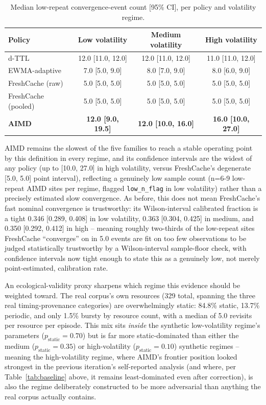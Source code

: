 \documentclass[11pt,letterpaper]{article}
\begin{document}
\begin{table}[!htbp]
\centering
\caption{Median low-repeat convergence-event count [95\% CI], per policy and volatility regime.}
\label{tab:convergence}
\begin{tabular}{lccc}
\toprule
Policy & Low volatility & Medium volatility & High volatility \\
\midrule
d-TTL & 12.0 [11.0, 12.0] & 12.0 [11.0, 12.0] & 11.0 [11.0, 12.0] \\
EWMA-adaptive & 7.0 [5.0, 9.0] & 8.0 [7.0, 9.0] & 8.0 [6.0, 9.0] \\
FreshCache (raw) & 5.0 [5.0, 5.0] & 5.0 [5.0, 5.0] & 5.0 [5.0, 5.0] \\
FreshCache (pooled) & 5.0 [5.0, 5.0] & 5.0 [5.0, 5.0] & 5.0 [5.0, 5.0] \\
\textbf{AIMD} & \textbf{12.0 [9.0, 19.5]} & \textbf{12.0 [10.0, 16.0]} & \textbf{16.0 [10.0, 27.0]} \\
\bottomrule
\end{tabular}
\end{table}

AIMD remains the slowest of the five families to reach a stable operating point by this definition in
every regime, and its confidence intervals are the widest of any policy (up to [10.0, 27.0] in high
volatility, versus FreshCache's degenerate [5.0, 5.0] point interval), reflecting a genuinely low sample
count (n=6-9 low-repeat AIMD sites per regime, flagged \texttt{low\_n\_flag} in low volatility) rather than a
precisely estimated slow convergence. As before, this does not mean FreshCache's fast nominal convergence
is trustworthy: its Wilson-interval calibrated fraction is a tight 0.346 [0.289, 0.408] in low volatility,
0.363 [0.304, 0.425] in medium, and 0.350 [0.292, 0.412] in high -- meaning roughly two-thirds of the
low-repeat sites FreshCache ``converges'' on in 5.0 events are fit on too few observations to be judged
statistically trustworthy by a Wilson-interval sample-floor check, with confidence intervals now tight
enough to state this as a genuinely low, not merely point-estimated, calibration rate.

An ecological-validity proxy sharpens which regime this evidence should be weighted toward. The real
corpus's own resources (329 total, spanning the three real timing-provenance categories) are
overwhelmingly static: 84.8\% static, 13.7\% periodic, and only 1.5\% bursty by resource count, with a median
of 5.0 revisits per resource per episode. This mix sits \emph{inside} the synthetic
low-volatility regime's parameters ($p_{\text{static}}=0.70$) but is far more static-dominated than either
the medium ($p_{\text{static}}=0.35$) or high-volatility ($p_{\text{static}}=0.10$) synthetic regimes --
meaning the high-volatility regime, where AIMD's frontier position looked strongest in the previous
iteration's self-reported analysis (and where, per Table~\ref{tab:baseline} above, it remains least-dominated even after
correction), is also the regime deliberately constructed to be more adversarial than anything the real
corpus actually contains.
\end{document}
